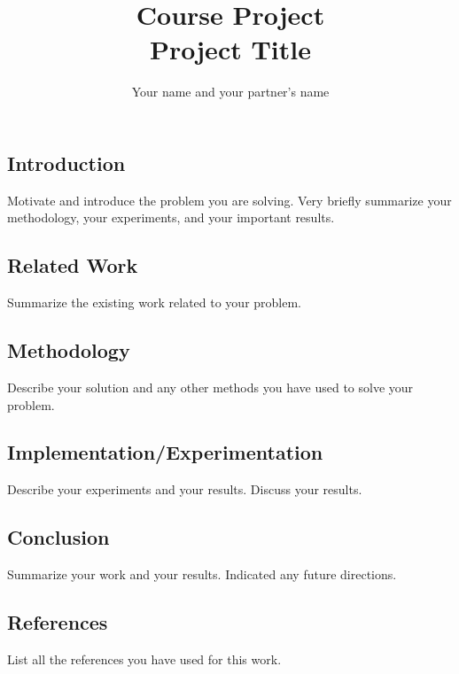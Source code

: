 \documentclass[letterpaper,twocolumn,10pt]{article}
\title{Course Project\\
Project Title}
\author{Your name and your partner's name}
\begin{document}
\maketitle

\subsection*{Introduction}

Motivate and introduce the problem you are solving. Very briefly summarize your methodology, your experiments, and your important results.

\subsection*{Related Work}

Summarize the existing work related to your problem.

\subsection*{Methodology}

Describe your solution and any other methods you have used to solve your problem.

\subsection*{Implementation/Experimentation}

Describe your experiments and your results. Discuss your results.

\subsection*{Conclusion}

Summarize your work and your results. Indicated any future directions.

\subsection*{References}

List all the references you have used for this work.
\end{document}
